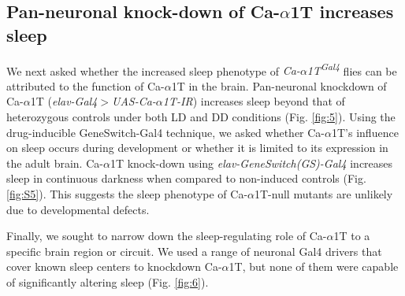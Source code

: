 \subsection*{Pan-neuronal knock-down of Ca-$\alpha$1T increases sleep}

We next asked whether the increased sleep phenotype of \emph{Ca-$\alpha$1T\textsuperscript{Gal4}} flies can be attributed to the function of Ca-$\alpha$1T in the brain.
Pan-neuronal knockdown of Ca-$\alpha$1T (\emph{elav-Gal4$>$UAS-Ca-$\alpha$1T-IR}) increases sleep beyond that of heterozygous controls under both LD and DD conditions (Fig. \ref{fig:5}).
Using the drug-inducible GeneSwitch-Gal4 technique\cite{Osterwalder:2001cl}, we asked whether Ca-$\alpha$1T's influence on sleep occurs during development or whether it is limited to its expression in the adult brain.
Ca-$\alpha$1T knock-down using \emph{elav-GeneSwitch(GS)-Gal4} increases sleep in continuous darkness when compared to non-induced controls (Fig. \ref{fig:S5}).
This suggests the sleep phenotype of Ca-$\alpha$1T-null mutants are unlikely due to developmental defects.

Finally, we sought to narrow down the sleep-regulating role of Ca-$\alpha$1T to a specific brain region or circuit.
We used a range of neuronal Gal4 drivers that cover known sleep centers to knockdown Ca-$\alpha$1T, but none of them were capable of significantly altering sleep (Fig. \ref{fig:6}).

